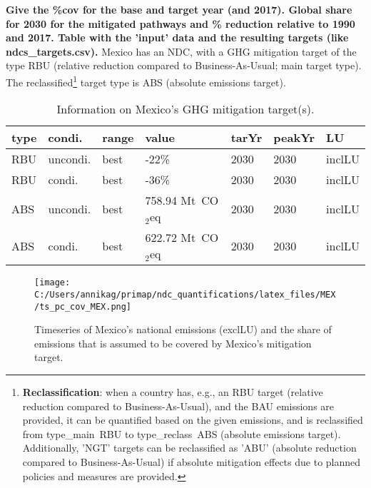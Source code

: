 \documentclass[12pt]{article}
\begin{document}
 \textbf{ 
 Give the \%cov for the base and target year (and 2017).
 Global share for 2030 for the mitigated pathways and \% reduction relative to 1990 and 2017.
 Table with the 'input' data and the resulting targets (like ndcs\_targets.csv).}
 Mexico has an NDC, with a GHG mitigation target of the type RBU (relative reduction compared to Business-As-Usual; main target type).
 The reclassified\footnote{\textbf{Reclassification}: when a country has, e.g., an RBU target (relative reduction compared to Business-As-Usual), and the BAU emissions are provided, it can be quantified based on the given emissions, and is reclassified from type\_main~RBU to type\_reclass~ABS (absolute emissions target).
 Additionally, 'NGT' targets can be reclassified as 'ABU' (absolute reduction compared to Business-As-Usual) if absolute mitigation effects due to planned policies and measures are provided.}  target type is ABS (absolute emissions target).
 \begin{table}[htbp]
 \centering
 \caption{Information on Mexico's GHG mitigation target(s).}
 \label{tab:mitiTars}
 \begin{tabular}{l l l l l l l }
 \bfseries type & \bfseries condi. & \bfseries range & \bfseries value & \bfseries tarYr & \bfseries peakYr & \bfseries LU \tabularnewline \hline
 RBU & uncondi. & best & -22\% & 2030 & 2030 & inclLU \tabularnewline 
 RBU & condi. & best & -36\% & 2030 & 2030 & inclLU \tabularnewline 
 ABS & uncondi. & best & 758.94 Mt~CO$_2$eq & 2030 & 2030 & inclLU \tabularnewline 
 ABS & condi. & best & 622.72 Mt~CO$_2$eq & 2030 & 2030 & inclLU \tabularnewline 
 \end{tabular}
 \end{table}
 \begin{figure}[htbp]
 \centering
 \texttt{[image: C:/Users/annikag/primap/ndc\_quantifications/latex\_files/MEX/ts\_pc\_cov\_MEX.png]}
 \caption{Timeseries of Mexico's national emissions (exclLU) and the share of emissions that is assumed to be covered by Mexico's mitigation target.}
 \label{fig:tsPcCov}
 \end{figure}
\end{document}
